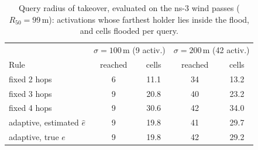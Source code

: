 \begin{table}[t]\centering
\caption{Query radius of takeover, evaluated on the ns-3 wind passes ($R_{50}=99$\,m): activations whose farthest holder
lies inside the flood, and cells flooded per query.}\label{tab:radius}
\footnotesize
\begin{tabular}{lcccc}\toprule
 & \multicolumn{2}{c}{$\sigma=100$\,m (9 activ.)} & \multicolumn{2}{c}{$\sigma=200$\,m (42 activ.)}\\
Rule & reached & cells & reached & cells\\\midrule
fixed 2 hops & 6 & 11.1 & 34 & 13.2\\
fixed 3 hops & 9 & 20.8 & 40 & 23.2\\
fixed 4 hops & 9 & 30.6 & 42 & 34.0\\
adaptive, estimated $\hat e$ & 9 & 19.8 & 41 & 29.7\\
adaptive, true $e$ & 9 & 19.8 & 42 & 29.2\\\bottomrule
\end{tabular}
\end{table}
